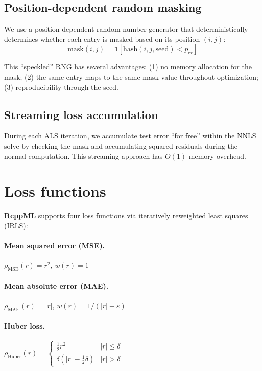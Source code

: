 \documentclass[11pt]{article}
\newcommand{\pkg}[1]{\textbf{#1}}
\begin{document}
\subsection{Position-dependent random masking}

We use a position-dependent random number generator that deterministically 
determines whether each entry is masked based on its position $(i, j)$:
\begin{equation}
  \text{mask}(i, j) = \mathbf{1}[\text{hash}(i, j, \text{seed}) < p_{\text{cv}}]
\end{equation}

This ``speckled'' RNG has several advantages: (1) no memory allocation for the 
mask; (2) the same entry maps to the same mask value throughout optimization; 
(3) reproducibility through the seed.

\subsection{Streaming loss accumulation}

During each ALS iteration, we accumulate test error ``for free'' within the 
NNLS solve by checking the mask and accumulating squared residuals during 
the normal computation. This streaming approach has $O(1)$ memory overhead.


\section{Loss functions} \label{sec:lossfunctions}

\pkg{RcppML} supports four loss functions via iteratively reweighted least 
squares (IRLS):

\paragraph{Mean squared error (MSE).} $\rho_{\text{MSE}}(r) = r^2$, $w(r) = 1$

\paragraph{Mean absolute error (MAE).} $\rho_{\text{MAE}}(r) = |r|$, 
$w(r) = 1/(|r| + \varepsilon)$

\paragraph{Huber loss.}
$\rho_{\text{Huber}}(r) = \begin{cases}
    \frac{1}{2}r^2 & |r| \leq \delta \\
    \delta(|r| - \frac{1}{2}\delta) & |r| > \delta
  \end{cases}$
\end{document}

